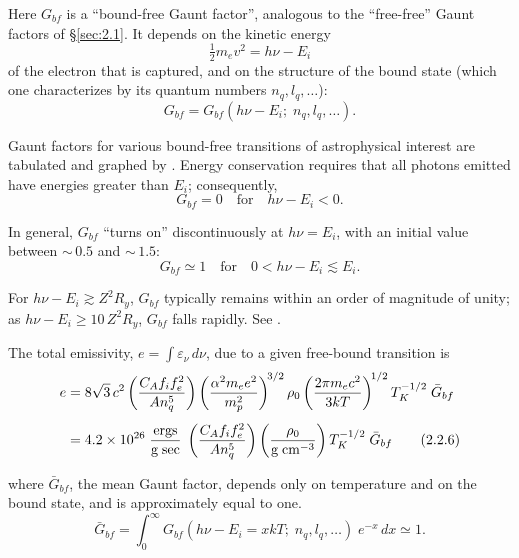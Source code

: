 Here $G_{bf}$ is a ``bound-free Gaunt factor'', analogous to the ``free-free'' Gaunt
factors of \S\ref{sec:2.1}.  It depends on the kinetic energy
\begin{equation}
\tfrac{1}{2}m_e v^2 = h\nu - E_i
\tag{2.2.2}
\end{equation}
of the electron that is captured, and on the structure of the bound state (which
one characterizes by its quantum numbers $n_q, l_q, \ldots$):
\begin{equation}
G_{bf} = G_{bf}(h\nu - E_i;\;n_q, l_q, \ldots).
\tag{2.2.3}
\end{equation}

Gaunt factors for various bound-free transitions of astrophysical interest are
tabulated and graphed by \citet{Karzas1961}.  Energy conservation
requires that all photons emitted have energies greater than $E_i$; consequently,
\begin{equation}
G_{bf} = 0 \quad \text{for} \quad h\nu - E_i < 0.
\tag{2.2.4}
\end{equation}

In general, $G_{bf}$ ``turns on'' discontinuously at $h\nu = E_i$, with an initial value
between ${\sim}\,0.5$ and ${\sim}\,1.5$:
\begin{equation}
G_{bf} \simeq 1 \quad \text{for} \quad 0 < h\nu - E_i \lesssim E_i.
\tag{2.2.5}
\end{equation}

For $h\nu - E_i \gtrsim Z^2 R_y$, $G_{bf}$ typically remains within an order of magnitude of
unity; as $h\nu - E_i \geq 10\,Z^2 R_y$, $G_{bf}$ falls rapidly.
See \citet{Karzas1961}.

The total emissivity, $e = \int \varepsilon_\nu\,d\nu$, due to a given free-bound transition is
\begin{align}
e &= 8\sqrt{3}\,c^2
\left(\frac{C_A f_i f_e^2}{An_q^5}\right)
\left(\frac{\alpha^2 m_e e^2}{m_p^2}\right)^{\!3/2}
\rho_0
\left(\frac{2\pi m_e c^2}{3kT}\right)^{\!1/2}
T_K^{-1/2}\;\bar{G}_{bf}
\notag\\[4pt]
&= 4.2 \times 10^{26}\;
\frac{\text{ergs}}{\text{g\;sec}}\;
\left(\frac{C_A f_i f_e^2}{An_q^5}\right)
\left(\frac{\rho_0}{\text{g\;cm}^{-3}}\right)
T_K^{-1/2}\;\bar{G}_{bf}
\tag{2.2.6}
\end{align}

where $\bar{G}_{bf}$, the mean Gaunt factor, depends only on temperature and on the
bound state, and is approximately equal to one.
\begin{equation}
\bar{G}_{bf} = \int_0^\infty G_{bf}(h\nu - E_i = xkT;\;n_q, l_q, \ldots)\;e^{-x}\,dx \simeq 1.
\tag{2.2.7}
\end{equation}

